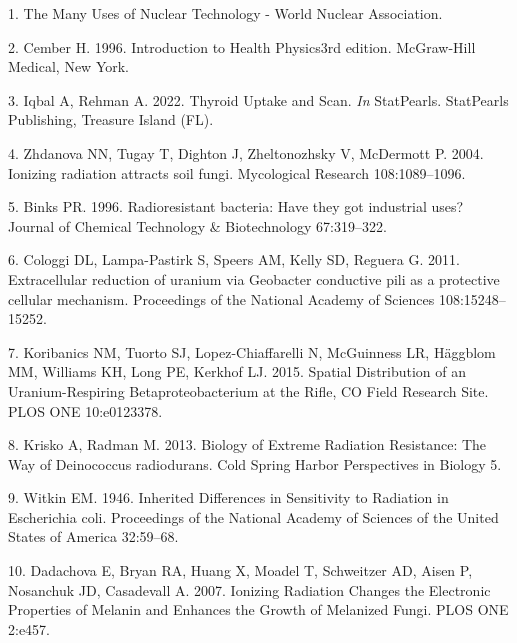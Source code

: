 \documentclass[12pt,twoside]{reedthesis}
\begin{document}

\noindent

\setlength{\parindent}{-0.20in}

\hypertarget{refs}{}
\leavevmode\hypertarget{ref-noauthor_many_nodate}{}%
1. The Many Uses of Nuclear Technology - World Nuclear Association.

\leavevmode\hypertarget{ref-cember_introduction_1996}{}%
2. Cember H. 1996. Introduction to Health Physics3rd edition. McGraw-Hill Medical, New York.

\leavevmode\hypertarget{ref-iqbal_thyroid_2022}{}%
3. Iqbal A, Rehman A. 2022. Thyroid Uptake and Scan. \emph{In} StatPearls. StatPearls Publishing, Treasure Island (FL).

\leavevmode\hypertarget{ref-zhdanova_ionizing_2004}{}%
4. Zhdanova NN, Tugay T, Dighton J, Zheltonozhsky V, McDermott P. 2004. Ionizing radiation attracts soil fungi. Mycological Research 108:1089--1096.

\leavevmode\hypertarget{ref-binks_radioresistant_1996}{}%
5. Binks PR. 1996. Radioresistant bacteria: Have they got industrial uses? Journal of Chemical Technology \& Biotechnology 67:319--322.

\leavevmode\hypertarget{ref-cologgi_extracellular_2011}{}%
6. Cologgi DL, Lampa-Pastirk S, Speers AM, Kelly SD, Reguera G. 2011. Extracellular reduction of uranium via Geobacter conductive pili as a protective cellular mechanism. Proceedings of the National Academy of Sciences 108:15248--15252.

\leavevmode\hypertarget{ref-koribanics_spatial_2015}{}%
7. Koribanics NM, Tuorto SJ, Lopez-Chiaffarelli N, McGuinness LR, Häggblom MM, Williams KH, Long PE, Kerkhof LJ. 2015. Spatial Distribution of an Uranium-Respiring Betaproteobacterium at the Rifle, CO Field Research Site. PLOS ONE 10:e0123378.

\leavevmode\hypertarget{ref-krisko_biology_2013}{}%
8. Krisko A, Radman M. 2013. Biology of Extreme Radiation Resistance: The Way of Deinococcus radiodurans. Cold Spring Harbor Perspectives in Biology 5.

\leavevmode\hypertarget{ref-witkin_inherited_1946}{}%
9. Witkin EM. 1946. Inherited Differences in Sensitivity to Radiation in Escherichia coli. Proceedings of the National Academy of Sciences of the United States of America 32:59--68.

\leavevmode\hypertarget{ref-dadachova_ionizing_2007}{}%
10. Dadachova E, Bryan RA, Huang X, Moadel T, Schweitzer AD, Aisen P, Nosanchuk JD, Casadevall A. 2007. Ionizing Radiation Changes the Electronic Properties of Melanin and Enhances the Growth of Melanized Fungi. PLOS ONE 2:e457.
\end{document}
